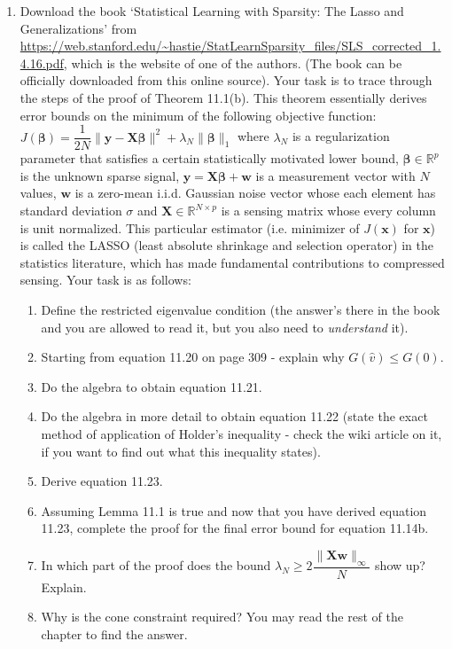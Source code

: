\documentclass[11pt]{article}
\begin{document}
\begin{enumerate}
\item Download the book `Statistical Learning with Sparsity: The Lasso and Generalizations' from \url{https://web.stanford.edu/~hastie/StatLearnSparsity_files/SLS_corrected_1.4.16.pdf}, which is the website of one of the authors. (The book can be officially downloaded from this online source). Your task is to trace through the steps of the proof of Theorem 11.1(b). This theorem essentially derives error bounds on the minimum of the following objective function: $J(\boldsymbol{\beta}) = \dfrac{1}{2N} \|\boldsymbol{y} - \boldsymbol{X \beta}\|^2 + \lambda_N \|\boldsymbol{\beta}\|_1$ where $\lambda_N$ is a regularization parameter that satisfies a certain statistically motivated lower bound, $\boldsymbol{\beta} \in \mathbb{R}^p$ is the unknown sparse signal, $\boldsymbol{y} = \boldsymbol{X \beta} + \boldsymbol{w}$ is a measurement vector with $N$ values, $\boldsymbol{w}$ is a zero-mean i.i.d. Gaussian noise vector whose each element has standard deviation $\sigma$ and $\boldsymbol{X} \in \mathbb{R}^{N \times p}$ is a sensing matrix whose every column is unit normalized. This particular estimator (i.e. minimizer of $J(\boldsymbol{x})$ for $\boldsymbol{x}$) is called the LASSO (least absolute shrinkage and selection operator) in the statistics literature, which has made fundamental contributions to compressed sensing. Your task is as follows:
\begin{enumerate}
\item Define the restricted eigenvalue condition (the answer's there in the book and you are allowed to read it, but you also need to \emph{understand} it). 
\item Starting from equation 11.20 on page 309 - explain why $G(\hat{v}) \leq G(0)$.
\item Do the algebra to obtain equation 11.21.
\item Do the algebra in more detail to obtain equation 11.22 (state the exact method of application of Holder's inequality - check the wiki article on it, if you want to find out what this inequality states).
\item Derive equation 11.23.
\item Assuming Lemma 11.1 is true and now that you have derived equation 11.23, complete the proof for the final error bound for equation 11.14b.
\item In which part of the proof does the bound $\lambda_N \geq 2 \dfrac{\|\boldsymbol{Xw}\|_{\infty}}{N}$ show up? Explain.
\item Why is the cone constraint required? You may read the rest of the chapter to find the answer.

\end{enumerate}
\end{enumerate}
\end{document}

